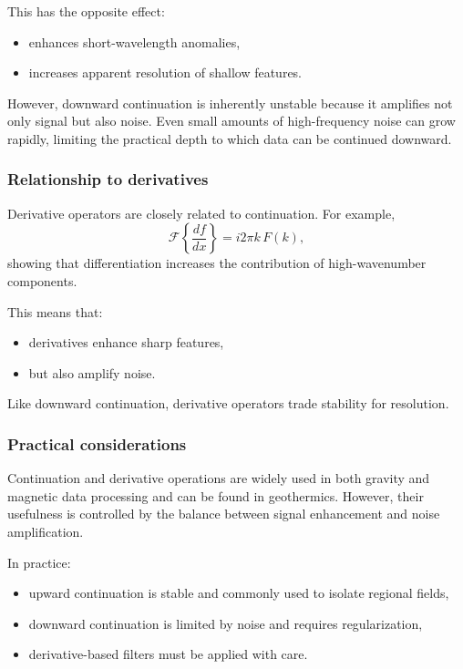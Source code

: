 This has the opposite effect:
\begin{itemize}
    \item enhances short-wavelength anomalies,
    \item increases apparent resolution of shallow features.
\end{itemize}

However, downward continuation is inherently unstable because it amplifies not only signal but also noise. Even small amounts of high-frequency noise can grow rapidly, limiting the practical depth to which data can be continued downward.

\subsubsection{Relationship to derivatives}

Derivative operators are closely related to continuation. For example,
\[
    \mathcal{F}\left\{\frac{df}{dx}\right\}
    = i 2 \pi k\,F(k),
\]
showing that differentiation increases the contribution of high-wavenumber components.

This means that:
\begin{itemize}
    \item derivatives enhance sharp features,
    \item but also amplify noise.
\end{itemize}

Like downward continuation, derivative operators trade stability for resolution.

\subsubsection{Practical considerations}

Continuation and derivative operations are widely used in both gravity and magnetic data processing and can be found in geothermics. However, their usefulness is controlled by the balance between signal enhancement and noise amplification.

In practice:
\begin{itemize}
    \item upward continuation is stable and commonly used to isolate regional fields,
    \item downward continuation is limited by noise and requires regularization,
    \item derivative-based filters must be applied with care.
\end{itemize}

